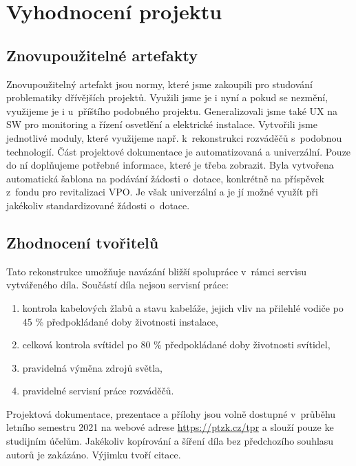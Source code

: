 \documentclass[a4paper, twoside, 11pt]{article}
\begin{document}
	
	
\section{Vyhodnocení projektu}
	\subsection{Znovupoužitelné artefakty}
		Znovupoužitelný artefakt jsou normy, které jsme zakoupili pro studování problematiky dřívějších projektů. Využili jsme je i nyní a pokud se nezmění, využijeme je i u~příštího podobného projektu. Generalizovali jsme také UX na SW pro monitoring a řízení osvetlění a elektrické instalace. Vytvořili jsme jednotlivé moduly, které využijeme např. k~rekonstrukci rozváděčů s~podobnou technologií. Část projektové dokumentace je automatizovaná a univerzální. Pouze do ní doplňujeme potřebné informace, které je třeba zobrazit.
		Byla vytvořena automatická šablona na podávání žádosti o~dotace, konkrétně na příspěvek z~fondu pro revitalizaci VPO. Je však univerzální a je jí možné využít při jakékoliv standardizované žádosti o~dotace.
	\subsection{Zhodnocení tvořitelů}
	
		Tato rekonstrukce umožňuje navázání bližší spolupráce v~rámci servisu vytvářeného díla. Součástí díla nejsou servisní práce:
		
		\begin{enumerate}
			\item kontrola kabelových žlabů a stavu kabeláže, jejich vliv na přilehlé vodiče po 45 \% předpokládané doby životnosti instalace,
			\item celková kontrola svítidel po 80 \% předpokládané doby životnosti svítidel,
			\item pravidelná výměna zdrojů světla,
			\item pravidelné servisní práce rozváděčů.
		\end{enumerate}
	
		Projektová dokumentace, prezentace a přílohy jsou volně dostupné v~průběhu  letního semestru 2021 na webové adrese \url{https://ptzk.cz/tpr} a slouží pouze ke studijním účelům. Jakékoliv kopírování a šíření díla bez předchozího souhlasu autorů je zakázáno. Výjimku tvoří citace.

\newpage
\printbibliography[title={{Zdroje}}]	
\nocite{*}

\end{document}
